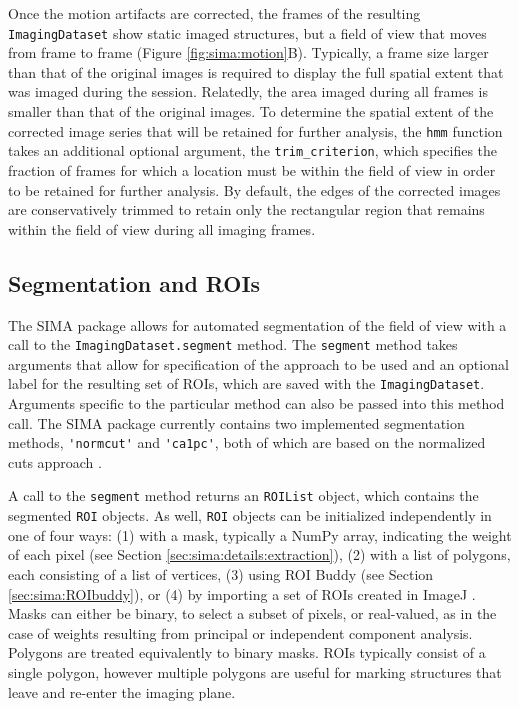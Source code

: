 Once the motion artifacts are corrected, the frames of the resulting \verb|ImagingDataset| show static
imaged structures, but a field of view that moves from frame to frame (Figure \ref{fig:sima:motion}B).
Typically, a frame size larger than that of the original images is required to display
the full spatial extent that was imaged during the session.
Relatedly, the area imaged during all frames is smaller than that of the original
images.
To determine the spatial extent of the corrected image series that will be
retained for further analysis, the \verb|hmm| function takes an additional
optional argument, 
the \verb|trim_criterion|, which specifies the fraction of frames for which
a location must be within the field of view in order to be retained for further
analysis.
By default, the edges of the corrected images are conservatively trimmed to retain
only the rectangular region that remains within the field of view during all imaging frames.

\subsection{Segmentation and ROIs}
\label{sec:sima:ROIs}
The SIMA package allows for automated segmentation of the field of view with a call to the \verb|ImagingDataset.segment|
method.
The \verb|segment| method takes arguments that allow for specification of the approach
to be used and an optional label for the resulting set of ROIs, which are saved
with the \verb|ImagingDataset|.
Arguments specific to the particular method can also be passed into this
method call.
The SIMA package currently contains two implemented segmentation methods,
\verb|'normcut'| and \verb|'ca1pc'|, 
both of which are based on the normalized cuts approach \citep{Shi2000}.

A call to the \verb|segment| method returns an \verb|ROIList| object,
which contains the segmented \verb|ROI| objects.
As well, \verb|ROI| objects can be initialized independently in one of four ways: 
(1) with a mask, typically a NumPy array, indicating the weight of each pixel (see Section \ref{sec:sima:details:extraction}),
(2) with a list of polygons, each consisting of a list of vertices,
(3) using ROI Buddy (see Section \ref{sec:sima:ROIbuddy}), or
(4) by importing a set of ROIs created in ImageJ \citep{Schneider2012}.
Masks can either be binary, to select a subset of pixels, or real-valued, as in the case of
weights resulting from principal or independent component analysis.
Polygons are treated equivalently to binary masks.
ROIs typically consist of a single polygon, however multiple polygons are useful
for marking structures that leave and re-enter the imaging plane.

